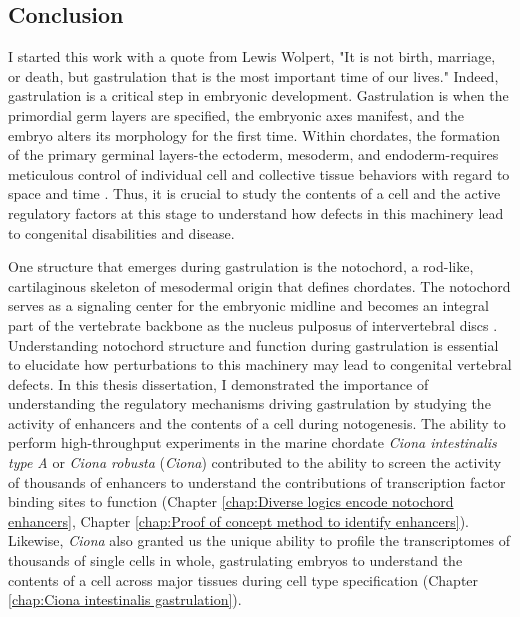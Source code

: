 \begin{dissertationepilogue}

    \setcounter{chapter}{5}
    \setcounter{section}{0}

    \section{Conclusion}
    I started this work with a quote from Lewis Wolpert, "It is not birth, marriage, or death, but gastrulation that is the most important time of our lives." Indeed, gastrulation is a critical step in embryonic development. Gastrulation is when the primordial germ layers are specified, the embryonic axes manifest, and the embryo alters its morphology for the first time. Within chordates, the formation of the primary germinal layers-the ectoderm, mesoderm, and endoderm-requires meticulous control of individual cell and collective tissue behaviors with regard to space and time \cite{ghimire2021,balmer2016,winkley2020,solnica-krezel2012}. Thus, it is crucial to study the contents of a cell and the active regulatory factors at this stage to understand how defects in this machinery lead to congenital disabilities and disease. 
    
    One structure that emerges during gastrulation is the notochord, a rod-like, cartilaginous skeleton of mesodermal origin that defines chordates. The notochord serves as a signaling center for the embryonic midline and becomes an integral part of the vertebrate backbone as the nucleus pulposus of intervertebral discs \cite{solnica-krezel2012,balmer2016,debree2018,winkley2020,ghimire2021,stemple2004,stemple2005,choi2008,raj2008a,lawson2015}. Understanding notochord structure and function during gastrulation is essential to elucidate how perturbations to this machinery may lead to congenital vertebral defects. In this thesis dissertation, I demonstrated the importance of understanding the regulatory mechanisms driving gastrulation by studying the activity of enhancers and the contents of a cell during notogenesis. The ability to perform high-throughput experiments in the marine chordate \textit{Ciona intestinalis type A} or \textit{Ciona robusta} (\textit{Ciona}) contributed to the ability to screen the activity of thousands of enhancers to understand the contributions of transcription factor binding sites to function (Chapter \ref{chap:Diverse logics encode notochord enhancers}, Chapter \ref{chap:Proof of concept method to identify enhancers}). Likewise, \textit{Ciona} also granted us the unique ability to profile the transcriptomes of thousands of single cells in whole, gastrulating embryos to understand the contents of a cell across major tissues during cell type specification (Chapter \ref{chap:Ciona intestinalis gastrulation}).


\end{dissertationepilogue}
